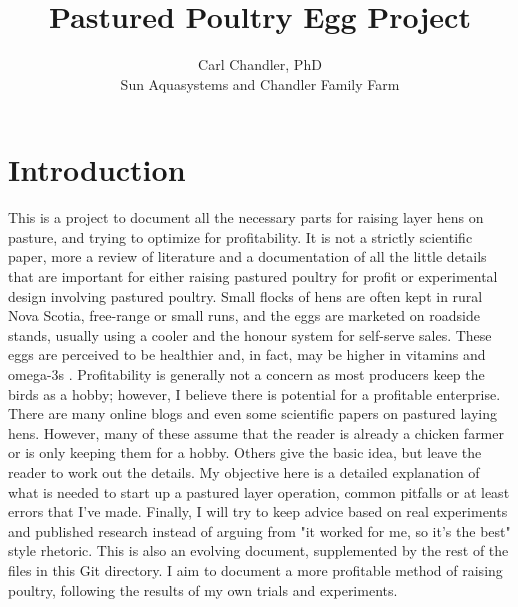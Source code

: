 \documentclass [11pt]{article}
\title{Pastured Poultry Egg Project}
\author{Carl Chandler, PhD \\Sun Aquasystems and Chandler Family Farm}
\begin{document}
\maketitle

\section{Introduction}
This is a project to document all the necessary parts for raising layer hens on pasture, and trying to optimize for profitability. It is not a strictly scientific paper, more a review of literature and a documentation of all the little details that are important for either raising pastured poultry for profit or experimental design involving pastured poultry. Small flocks of hens are often kept in rural Nova Scotia, free-range or small runs, and the eggs are marketed on roadside stands, usually using a cooler and the honour system for self-serve sales. These eggs are perceived to be healthier and, in fact, may be higher in vitamins and omega-3s \cite{karsten2010vitamins}.  Profitability is generally not a concern as most producers keep the birds as a hobby; however, I believe there is potential for a profitable enterprise. There are many online blogs and even some scientific papers on pastured laying hens. However, many of these assume that the reader is already a chicken farmer or is only keeping them for a hobby. Others give the basic idea, but leave the reader to work out the details. \cite{berton2012} My objective here is a detailed explanation of what is needed to start up a pastured layer operation, common pitfalls or at least errors that I've made. Finally, I will try to keep advice based on real experiments and published research instead of arguing from "it worked for me, so it's the best" style rhetoric. This is also an evolving document, supplemented by the rest of the files in this Git directory. I aim to document a more profitable method of raising poultry, following the results of my own trials and experiments.  
\end{document}
